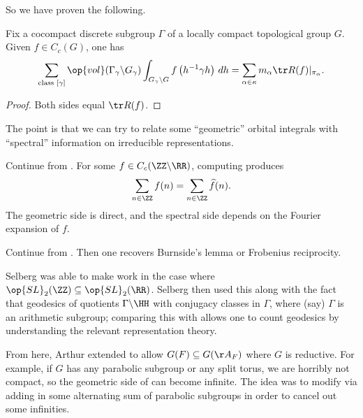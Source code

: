 \documentclass{article}
\begin{document}
So we have proven the following.
\begin{theorem} \label{thm:tr-form}
	Fix a cocompact discrete subgroup $\Gamma$ of a locally compact topological group $G$. Given $f\in C_c(G)$, one has
	\[\sum_{\text{class }[\gamma]}\op{vol}(\Gamma_\gamma\backslash G_\gamma)\int_{G_\gamma\backslash G}f\left(h^{-1}\gamma h\right)\,dh=\sum_{\alpha\in\kappa}m_\alpha\tr R(f)|_{\pi_\alpha}.\]
\end{theorem}
\begin{proof}
	Both sides equal $\tr R(f)$.
\end{proof}
The point is that we can try to relate some ``geometric'' orbital integrals with ``spectral'' information on irreducible representations.
\begin{example}
	Continue from . For some $f\in C_c(\ZZ\backslash\RR)$, computing  produces
	\[\sum_{n\in\ZZ}f(n)=\sum_{n\in\ZZ}\widehat f(n).\]
	The geometric side is direct, and the spectral side depends on the Fourier expansion of $f$.
\end{example}
\begin{example}
	Continue from . Then one recovers Burnside's lemma or Frobenius reciprocity.
\end{example}
\begin{example}
	Selberg was able to make  work in the case where $\op{SL}_2(\ZZ)\subseteq\op{SL}_2(\RR)$. Selberg then used this along with the fact that geodesics of quotients $\Gamma\backslash\HH$ with conjugacy classes in $\Gamma$, where (say) $\Gamma$ is an arithmetic subgroup; comparing this with  allows one to count geodesics by understanding the relevant representation theory.
\end{example}
From here, Arthur extended  to allow $G(F)\subseteq G(\AA_F)$ where $G$ is reductive. For example, if $G$ has any parabolic subgroup or any split torus, we are horribly not compact, so the geometric side of  can become infinite. The idea was to modify  via adding in some alternating sum of parabolic subgroups in order to cancel out some infinities.
\end{document}
